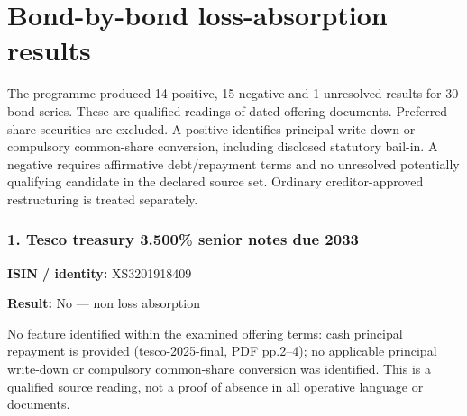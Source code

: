 \documentclass[
  11pt,
]{article}
\author{}
\date{}
\begin{document}
\hypertarget{bond-by-bond-loss-absorption-results}{%
\section{Bond-by-bond loss-absorption
results}\label{bond-by-bond-loss-absorption-results}}

The programme produced 14 positive, 15 negative and 1 unresolved results
for 30 bond series. These are qualified readings of dated offering
documents. Preferred-share securities are excluded. A positive
identifies principal write-down or compulsory common-share conversion,
including disclosed statutory bail-in. A negative requires affirmative
debt/repayment terms and no unresolved potentially qualifying candidate
in the declared source set. Ordinary creditor-approved restructuring is
treated separately.

\begin{minipage}{\linewidth}

\hypertarget{tesco-treasury-3.500-senior-notes-due-2033}{%
\subsubsection{1. Tesco treasury 3.500\% senior notes due
2033}\label{tesco-treasury-3.500-senior-notes-due-2033}}

\textbf{ISIN / identity:} XS3201918409

\textbf{Result:} No --- non loss absorption

No feature identified within the examined offering terms: cash principal
repayment is provided
(\href{https://www.tescoplc.com/media/0j2nadja/uko2-2011157941-v2-slinky-final-terms-executed.pdf}{tesco-2025-final},
PDF pp.2--4); no applicable principal write-down or compulsory
common-share conversion was identified. This is a qualified source
reading, not a proof of absence in all operative language or documents.

\end{minipage}
\par\addvspace{1.1em}
\end{document}
